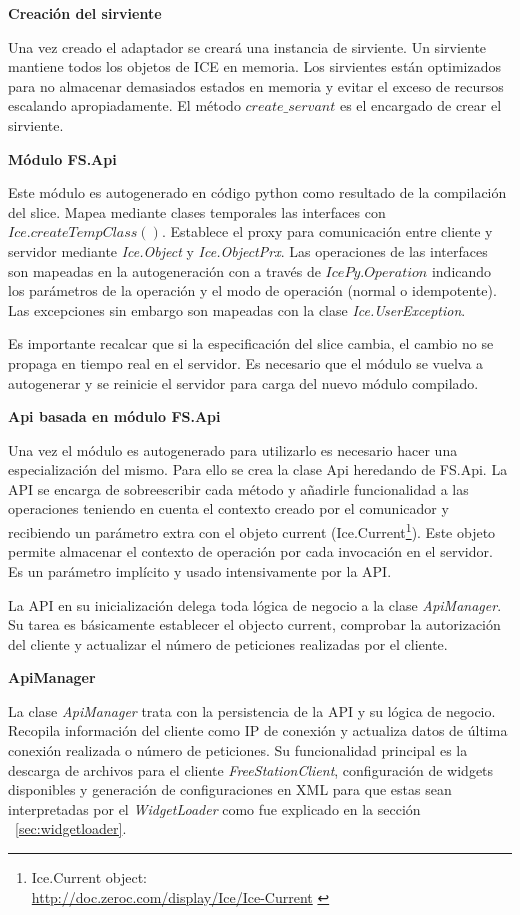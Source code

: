 \textbf{Creación del sirviente}

Una vez creado el adaptador se creará una instancia de sirviente. Un sirviente
mantiene todos los objetos de ICE en memoria. Los sirvientes están optimizados
para no almacenar demasiados estados en memoria y evitar el exceso de recursos
escalando apropiadamente. El método $create\_servant$ es el encargado de crear
el sirviente.

\newpage

\textbf{Módulo FS.Api}

Este módulo es autogenerado en código python como resultado de la compilación
del slice. Mapea mediante clases temporales las interfaces con
$Ice.createTempClass()$. Establece el proxy para comunicación entre
cliente y servidor mediante \emph{Ice.Object} y \emph{Ice.ObjectPrx}. Las
operaciones de las interfaces son mapeadas en la autogeneración con a través de
$IcePy.Operation$ indicando los parámetros de la operación y el modo de
operación (normal o idempotente). Las excepciones sin embargo son mapeadas con
la clase \emph{Ice.UserException}.

Es importante recalcar que si la especificación del slice cambia, el cambio no
se propaga en tiempo real en el servidor. Es necesario que el módulo se vuelva a
autogenerar y se reinicie el servidor para carga del nuevo módulo compilado.

\textbf{Api basada en módulo FS.Api}

Una vez el módulo es autogenerado para utilizarlo es necesario hacer una
especialización del mismo. Para ello se crea la clase Api heredando de FS.Api.
La API se encarga de sobreescribir cada método y añadirle funcionalidad a las
operaciones teniendo en cuenta el contexto creado por el comunicador y
recibiendo un parámetro extra con el objeto current
(Ice.Current\footnote{Ice.Current object:\\
\url{http://doc.zeroc.com/display/Ice/Ice-Current}
\label{ftn:icecurrent}}). Este objeto permite almacenar el contexto de operación
por cada invocación en el servidor. Es un parámetro implícito y usado
intensivamente por la API.

La API en su inicialización delega toda lógica de negocio a la clase
\emph{ApiManager}. Su tarea es básicamente establecer el objecto current,
comprobar la autorización del cliente y actualizar el número de peticiones
realizadas por el cliente.

\textbf{ApiManager}

La clase \emph{ApiManager} trata con la persistencia de la API y su lógica de
negocio. Recopila información del cliente como IP de conexión y actualiza datos
de última conexión realizada o número de peticiones. Su funcionalidad principal
es la descarga de archivos para el cliente \emph{FreeStationClient},
configuración de widgets disponibles y generación de configuraciones en XML para
que estas sean interpretadas por el \emph{WidgetLoader} como fue explicado en la
sección ~\ref{sec:widgetloader}.


